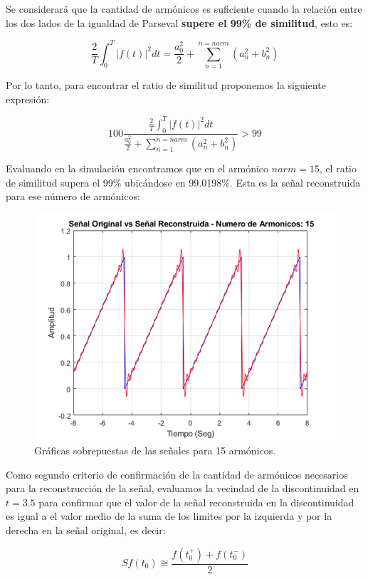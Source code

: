 \documentclass[11pt,a4paper,twocolumn]{article}
\begin{document}
    Se considerará que la cantidad de armónicos es suficiente cuando la relación entre los dos lados 
    de la igualdad de Parseval \textbf{supere el 99\% de similitud}, esto es:

    \begin{equation*}
        \frac{2}{T} \int_{0}^{T} \left|f(t)\right|^2 dt=\frac{a_{0}^2}{2} + \sum_{n=1}^{n=narm} (a_{n}^2 +b_{n}^2)
    \end{equation*}

    Por lo tanto, para encontrar el ratio de similitud proponemos la siguiente expresión:

    \begin{equation*}
        100 \frac{\frac{2}{T} \int_{0}^{T} \left|f(t)\right|^2 dt}{\frac{a_{0}^2}{2} +\sum_{n=1}^{n=narm}(a_{n}^2 +b_{n}^2)} > 99
    \end{equation*}

    Evaluando en la simulación encontramos que en el armónico $narm=15$, el ratio de 
    similitud supera el 99\% ubicándose en 99.0198\%. Esta es la señal reconstruida para ese 
    número de armónicos:
    
    \begin{figure}
       \centering 
       \includegraphics[width=0.5\linewidth]{img/figure5.png}
       \caption{Gráficas sobrepuestas de las señales para 15 armónicos.}
       \label{figure5}
    \end{figure}

    Como segundo criterio de confirmación de la cantidad de armónicos necesarios para la 
    reconstrucción de la señal, evaluamos la vecindad de la discontinuidad en $t=3.5$ para 
    confirmar que el valor de la señal reconstruida en la discontinuidad es igual a el valor 
    medio de la suma de los limites por la izquierda y por la derecha en la señal original, es 
    decir: 

    \begin{equation*}
       Sf(t_0) \cong \frac{f(t_0^+)+f(t_0^-)}{2}
    \end{equation*}
\end{document}
